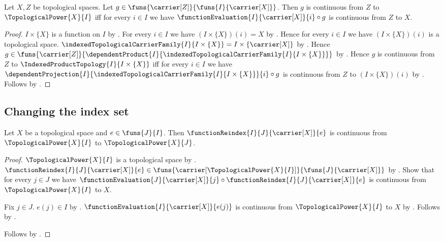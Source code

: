 \begin{theorem}\label{topological_power_continuity_iff}
    Let $X,Z$ be topological spaces.
    Let $g\in\funs{\carrier[Z]}{\funs{I}{\carrier[X]}}$.
    Then $g$ is continuous from $Z$ to $\TopologicalPower{X}{I}$ iff
        for every $i\in I$ we have
            $\functionEvaluation{I}{\carrier[X]}{i}\circ g$ is continuous from $Z$ to $X$.
\end{theorem}
\begin{proof}
    $I\times\{X\}$ is a function on $I$ by
        .
    For every $i\in I$ we have $(I\times\{X\})(i)=X$ by
        .
    Hence for every $i\in I$ we have $(I\times\{X\})(i)$ is a topological space.
    $\indexedTopologicalCarrierFamily{I}{I\times\{X\}}=I\times\{\carrier[X]\}$ by
        .
    Hence $g\in\funs{\carrier[Z]}{
        \dependentProduct{I}{\indexedTopologicalCarrierFamily{I}{I\times\{X\}}}}$ by
        .
    Hence $g$ is continuous from $Z$ to $\IndexedProductTopology{I}{I\times\{X\}}$ iff
        for every $i\in I$ we have
            $\dependentProjection{I}{\indexedTopologicalCarrierFamily{I}{I\times\{X\}}}{i}\circ g$
                is continuous from $Z$ to $(I\times\{X\})(i)$ by
        .
    Follows by .
\end{proof}

\subsection{Changing the index set}

\begin{theorem}\label{topological_power_reindex_continuous}
    Let $X$ be a topological space and $e\in\funs{J}{I}$.
    Then $\functionReindex{I}{J}{\carrier[X]}{e}$ is continuous from
        $\TopologicalPower{X}{I}$ to $\TopologicalPower{X}{J}$.
\end{theorem}
\begin{proof}
    $\TopologicalPower{X}{I}$ is a topological space by
        .
    $\functionReindex{I}{J}{\carrier[X]}{e}\in
        \funs{\carrier[\TopologicalPower{X}{I}]}{\funs{J}{\carrier[X]}}$ by
        .
    Show that for every $j\in J$ we have
        $\functionEvaluation{J}{\carrier[X]}{j}\circ\functionReindex{I}{J}{\carrier[X]}{e}$
            is continuous from $\TopologicalPower{X}{I}$ to $X$.
    \begin{subproof}
        Fix $j\in J$.
        $e(j)\in I$ by .
        $\functionEvaluation{I}{\carrier[X]}{e(j)}$ is continuous from
            $\TopologicalPower{X}{I}$ to $X$ by .
        Follows by .
    \end{subproof}
    Follows by .
\end{proof}

